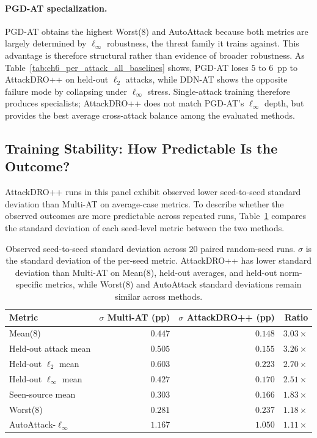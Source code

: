 \paragraph{PGD-AT specialization.}
PGD-AT obtains the highest Worst(8) and AutoAttack because both metrics are
largely determined by $\ell_\infty$ robustness, the threat family it trains against.
This advantage is therefore structural rather than evidence of broader
robustness. As Table~\ref{tab:ch6_per_attack_all_baselines} shows, PGD-AT loses
$5$ to $6$~pp to AttackDRO++ on held-out $\ell_2$ attacks, while DDN-AT shows the
opposite failure mode by collapsing under $\ell_\infty$ stress. Single-attack
training therefore produces specialists; AttackDRO++ does not match PGD-AT's
$\ell_\infty$ depth, but provides the best average cross-attack balance among
the evaluated methods.

\subsection{Training Stability: How Predictable Is the Outcome?}
\label{subsec:ch6_training_stability}

AttackDRO++ runs in this panel exhibit observed lower seed-to-seed standard deviation
than Multi-AT on average-case metrics. To describe whether the observed outcomes
are more predictable across repeated runs, Table~\ref{tab:ch6_variance_reduction}
compares the standard deviation of each seed-level metric between the two
methods.

\begin{table}[H]
\centering
\caption{Observed seed-to-seed standard deviation across 20 paired random-seed
runs. \(\sigma\) is the standard deviation of the per-seed metric. AttackDRO++
has lower standard deviation than Multi-AT on Mean(8), held-out averages, and
held-out norm-specific metrics, while Worst(8) and AutoAttack standard
deviations remain similar across methods.}
\label{tab:ch6_variance_reduction}
\small
\setlength{\tabcolsep}{5pt}
\renewcommand{\arraystretch}{1.08}
\begin{tabular}{lrrr}
\toprule
Metric & \(\sigma\) Multi-AT (pp) & \(\sigma\) AttackDRO++ (pp) & Ratio \\
\midrule
Mean(8)
& $0.447$ & $0.148$ & $3.03\times$ \\

Held-out attack mean
& $0.505$ & $0.155$ & $3.26\times$ \\

Held-out $\ell_2$ mean
& $0.603$ & $0.223$ & $2.70\times$ \\

Held-out $\ell_\infty$ mean
& $0.427$ & $0.170$ & $2.51\times$ \\

Seen-source mean
& $0.303$ & $0.166$ & $1.83\times$ \\

\midrule
Worst(8)
& $0.281$ & $0.237$ & $1.18\times$ \\

AutoAttack-$\ell_\infty$
& $1.167$ & $1.050$ & $1.11\times$ \\
\bottomrule
\end{tabular}
\end{table}


